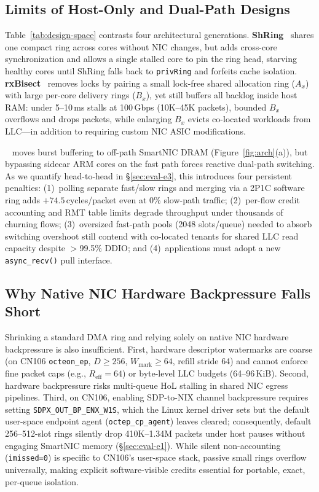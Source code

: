 \subsection{Limits of Host-Only and Dual-Path Designs}
\label{sec:bg-evolution}

Table~\ref{tab:design-space} contrasts four architectural generations.
\textbf{ShRing}~\cite{pismenny2023shring} shares one compact ring across cores
without NIC changes, but adds cross-core synchronization and allows a single
stalled core to pin the ring head, starving healthy cores until ShRing falls
back to \texttt{privRing} and forfeits cache isolation.
\textbf{rxBisect}~\cite{pismenny2025rxbisect} removes locks by pairing a small
lock-free shared allocation ring ($A_x$) with large per-core delivery rings
($B_x$), yet still buffers all backlog inside host RAM: under 5--10\,ms stalls
at 100\,Gbps (10K--45K packets), bounded $B_x$ overflows and drops packets,
while enlarging $B_x$ evicts co-located workloads from LLC---in addition to
requiring custom NIC ASIC modifications.

\textbf{\ceio{}}~\cite{liu2025ceio} moves burst buffering to off-path SmartNIC
DRAM (Figure~\ref{fig:arch}(a)), but bypassing sidecar ARM cores on the fast
path forces reactive dual-path switching. As we quantify head-to-head in
\S\ref{sec:eval-e3}, this introduces four persistent penalties: (1)~polling
separate fast/slow rings and merging via a 2P1C software ring adds
$+74.5$\,cycles/packet even at 0\% slow-path traffic; (2)~per-flow credit
accounting and RMT table limits degrade throughput under thousands of churning
flows; (3)~oversized fast-path pools (2048 slots/queue) needed to absorb
switching overshoot still contend with co-located tenants for shared LLC read
capacity despite $>$99.5\% DDIO; and (4)~applications must adopt a new
\texttt{async\_recv()} pull interface.

\subsection{Why Native NIC Hardware Backpressure Falls Short}
\label{sec:bg-backpressure}

Shrinking a standard DMA ring and relying solely on native NIC hardware
backpressure is also insufficient. First, hardware descriptor watermarks are
coarse (on CN106 \texttt{octeon\_ep}, $D \ge 256$, $W_{\text{mark}} \ge 64$,
refill stride 64) and cannot enforce fine packet caps (e.g., $R_{\text{eff}}=64$)
or byte-level LLC budgets (64--96\,KiB). Second, hardware backpressure risks
multi-queue HoL stalling in shared NIC egress pipelines. Third, on CN106,
enabling SDP-to-NIX channel backpressure requires setting
\texttt{SDPX\_OUT\_BP\_ENX\_W1S}, which the Linux
kernel driver sets but the default user-space endpoint agent
(\texttt{octep\_cp\_agent}) leaves cleared; consequently, default 256--512-slot
rings silently drop 410K--1.34M packets under host pauses without engaging
SmartNIC memory (\S\ref{sec:eval-e1}). While silent non-accounting
(\texttt{imissed=0}) is specific to CN106's user-space stack, passive small
rings overflow universally, making explicit software-visible credits essential
for portable, exact, per-queue isolation.
